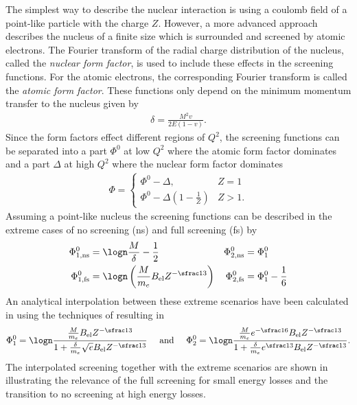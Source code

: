 The simplest way to describe the nuclear interaction is using a coulomb field of a point-like particle with the charge $Z$.
However, a more advanced approach describes the nucleus of a finite size which is surrounded and screened by atomic electrons.
The Fourier transform of the radial charge distribution of the nucleus, called the \textit{nuclear form factor}, is used to include these effects in the screening functions.
For the atomic electrons, the corresponding Fourier transform is called the \textit{atomic form factor}.
These functions only depend on the minimum momentum transfer to the nucleus given by
\begin{align}
    \delta = \frac{M^2 v}{2E(1 - v)}.
\end{align}
Since the form factors effect different regions of $Q^2$, the screening functions can be separated into a part $\Phi^0$ at low $Q^2$ where the atomic form factor dominates and a part $\Delta$ at high $Q^2$ where the nuclear form factor dominates
\begin{align} \label{eq:screen}
    \Phi = \begin{cases}
        \Phi^0 - \Delta, & Z=1 \\
        \Phi^0 - \Delta(1 - \frac{1}{Z}) & Z>1.
    \end{cases}
\end{align}
Assuming a point-like nucleus the screening functions can be described in the extreme cases of no screening (ns) and full screening (fs) by
\begin{subequations} \label{eq:brems_ns_fs}
\begin{align}
    \Phi_{1, \mathrm{ns}}^0 &= \logn \frac{M}{\delta} - \frac{1}{2}
    & \Phi_{2, \mathrm{ns}}^0 &= \Phi_1^0
    \\
    \Phi_{1, \mathrm{fs}}^0 &= \logn \left( \frac{M}{m_e} B_{\text{el}} Z^{-\sfrac13} \right)
    & \Phi_{2, \mathrm{fs}}^0 &= \Phi_1^0 - \frac{1}{6}
\end{align}
\end{subequations}
An analytical interpolation between these extreme scenarios have been calculated in \cite{Sandrock18PhD} using the techniques of \cite{Petrukhin68} resulting in 
\begin{align} \label{eq:brems_screen_interpol}
    \Phi_1^0 =
        \logn \frac{\frac{M}{m_e} B_{\text{el}}Z^{-\sfrac13}}{1 + \frac{\delta}{m_e}\sqrt{e} B_{\text{el}} Z^{-\sfrac13}}
    \quad
    \text{ and }
    \quad
    \Phi_2^0 =
        \logn \frac{\frac{M}{m_e} e^{-\sfrac16} B_{\text{el}}Z^{-\sfrac13}}{1 + \frac{\delta}{m_e} e^{\sfrac13} B_{\text{el}} Z^{-\sfrac13}}.
\end{align}
The interpolated screening together with the extreme scenarios are shown in  illustrating the relevance of the full screening for small energy losses and the transition to no screening at high energy losses.

